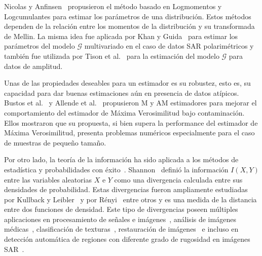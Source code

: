 Nicolas y Anfinsen~\cite{nicolas2002} propusieron el método basado en Logmomentos y Logcumulantes para estimar los parámetros de una distribución. Estos métodos dependen de la relación entre los momentos de la distribución y su transformada de Mellin. La misma idea fue aplicada por Khan y Guida~\cite{khan2014} para estimar los parámetros del modelo $\mathcal{G}$ multivariado en el caso de datos SAR polarimétricos y también fue utilizada por Tison et al.~\cite{Tison2004} para la estimación del modelo $\mathcal{G}$ para datos de amplitud.

Unas de las propiedades deseables para un estimador es su robustez, esto es, su capacidad para dar buenas estimaciones aún en presencia de datos atípicos. Bustos et al.~\cite{BustosFreryLucini:Mestimators:2001} y Allende et al.~\cite{AllendeFreryetal:JSCS:05} propusieron M y AM estimadores para mejorar el comportamiento del estimador de Máxima Verosimilitud bajo contaminación. Ellos mostraron que su propuesta, si bien supera la performance del estimador de Máxima Verosimilitud, presenta problemas numéricos especialmente para el caso de muestras de pequeño tamaño.

Por otro lado, la teoría de la información ha sido aplicada a los métodos de estadística y probabilidades con éxito~\cite{Liese2006}. 
Shannon~\cite{Shannon1948} definió la información $I(X,Y)$ entre las variables aleatorias $X$ e $Y$ como una divergencia calculada entre sus densidades de probabilidad. 
Estas divergencias fueron ampliamente estudiadas por Kullback y Leibler~\cite{KullbackLeibler1951} y por Rényi~\cite{renyi1961} entre otros y es una medida de la distancia entre dos funciones de densidad. 
Este tipo de divergencias poseen múltiples aplicaciones en procesamiento de señales e imágenes~\cite{Aviyente2007}, análisis de imágenes médicas~\cite{5599869},
clasificación de texturas~\cite{1246862}, restauración de imágenes~\cite{1224731} e incluso en detección automática de regiones con diferente grado de rugosidad en imágenes SAR~\cite{6377288,ClassificationPolSARSegmentsMinimizationWishartDistances}.


